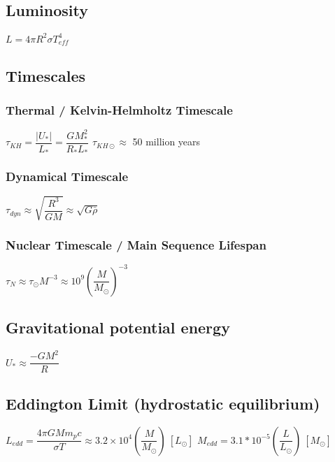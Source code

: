 	\subsection{Luminosity}
\begin{itemize}
\itemt \( L = 4\pi R^2 \sigma T_{eff}^4 \)
\end{itemize}
    
    \subsection{Timescales}

\subsubsection{Thermal / Kelvin-Helmholtz Timescale}
\begin{itemize}
\itemt \( \tau_{KH} = \dfrac{|U_*|}{L_*} = \dfrac{GM_*^2}{R_*L_*} \)
\itemt \( \tau_{KH\odot} \approx\) 50 million years
\end{itemize}

\subsubsection{Dynamical Timescale}
\begin{itemize}
\itemt \( \tau_{dyn} \approx \sqrt{\dfrac{R^3}{GM}} \approx \sqrt{G\bar{\rho}} \)
\end{itemize}

\subsubsection{Nuclear Timescale / Main Sequence Lifespan}
\begin{itemize}
\itemt \( \tau_N \approx \tau_{\odot}M^{-3} \approx 10^9 (\dfrac{M}{M_{\odot}})^{-3} \)
\end{itemize}


		\subsection{Gravitational potential energy}
\begin{itemize}
\itemt \( U_* \approx \dfrac{-GM^2}{R} \)
\end{itemize}

		\subsection{Eddington Limit (hydrostatic equilibrium)}
\begin{itemize}
\itemt \( L_{edd} = \dfrac{4\pi G M m_p c}{\sigma T} \approx 3.2 \times 10^4 (\dfrac{M}{M_\odot})\ [L_\odot] \)
\itemt \( M_{edd} = 3.1*10^{-5} (\dfrac{L}{L_\odot})\ [M_\odot] \)
\end{itemize}

